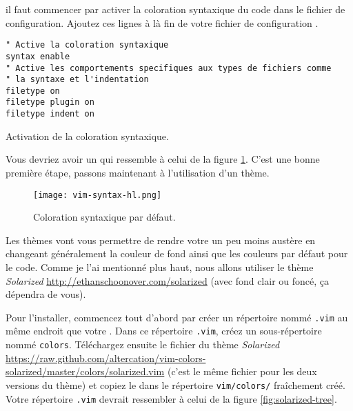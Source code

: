  il faut commencer par activer la coloration syntaxique du code dans le fichier de configuration. Ajoutez ces lignes à là fin de votre fichier de configuration \vimrc.

\begin{listing}[H]
\begin{verbatim}
" Active la coloration syntaxique
syntax enable
" Active les comportements specifiques aux types de fichiers comme
" la syntaxe et l'indentation
filetype on
filetype plugin on
filetype indent on
\end{verbatim}
  \caption{Activation de la coloration syntaxique.}
  \label{lst:syntax-hl}
\end{listing}

Vous devriez avoir un \vim qui ressemble à celui de la figure \ref{fig:syntax-hl}. C'est une bonne première étape, passons maintenant à l'utilisation d'un thème.

\begin{figure}%
  \texttt{[image: vim-syntax-hl.png]}
  \caption{Coloration syntaxique par défaut.}
  \label{fig:syntax-hl}
\end{figure}

Les thèmes vont vous permettre de rendre votre \vim un peu moins austère en changeant généralement la couleur de fond ainsi que les couleurs par défaut pour le code. Comme je l'ai mentionné plus haut, nous allons utiliser le thème \emph{Solarized} \url{http://ethanschoonover.com/solarized} (avec fond clair ou foncé, ça dépendra de vous).

Pour l'installer, commencez tout d'abord par créer un répertoire nommé \Verb|.vim| au même endroit que votre \vimrc{}. Dans ce répertoire \Verb|.vim|, créez un sous-répertoire nommé \Verb|colors|. Téléchargez ensuite le fichier du thème \emph{Solarized} \url{https://raw.github.com/altercation/vim-colors-solarized/master/colors/solarized.vim} (c'est le même fichier pour les deux versions du thème) et copiez le dans le répertoire \Verb|vim/colors/| fraîchement créé. Votre répertoire \Verb|.vim| devrait ressembler à celui de la figure \ref{fig:solarized-tree}.

